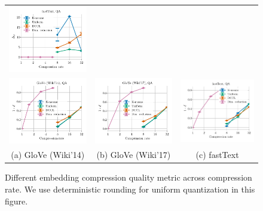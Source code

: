\begin{figure}
\begin{tabular}{@{\hskip -0.0in}c@{\hskip -0.0in}c@{\hskip -0.0in}c@{\hskip -0.0in}}
		\includegraphics[width=.245\linewidth]{figures/fasttext1m_synthetics-large-dim_gram-large-dim-delta2-2_vs_compression_linx_det.pdf}	\\
		\includegraphics[width=.245\linewidth]{figures/glove400k_synthetics-large-dim_subspace-dist-normalized_vs_compression_linx_det.pdf} &
		\includegraphics[width=.245\linewidth]{figures/glove-wiki400k-am_synthetics-large-dim_subspace-dist-normalized_vs_compression_linx_det.pdf} &
		\includegraphics[width=.245\linewidth]{figures/fasttext1m_synthetics-large-dim_subspace-dist-normalized_vs_compression_linx_det.pdf}	\\
		(a) GloVe (Wiki'14) & \;\;\;\;(b) GloVe (Wiki'17)  & \;\;\;\;\;\;(c) fastText
	\end{tabular}
	\caption{Different embedding compression quality metric across compression rate. We use deterministic rounding for uniform quantization in this figure. }
	\label{fig:metric_vs_correlation_deterministic}
\end{figure}

